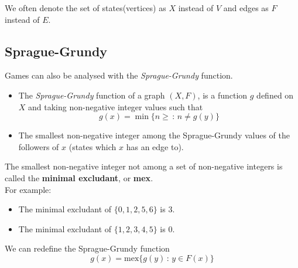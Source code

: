 \documentclass[12pt,t]{beamer}
\newcommand{\bi}{\begin{itemize}}
\newcommand{\ei}{\end{itemize}}
\begin{document}
\begin{frame}[fragile]
\begin{figure}
  \end{figure}
  We often denote the set of states(vertices) as $X$ instead of $V$ and edges as $F$ instead of $E$.
\end{frame}

\subsection{Sprague-Grundy}
\begin{frame}
  \vspace{30pt}
  Games can also be analysed with the \emph{Sprague-Grundy} function.
  \bi
    \item The \emph{Sprague-Grundy} function of a graph $(X,F)$, is a function $g$ defined on $X$ and taking non-negative integer values such that
      \[
        g(x) = \min\{n \geq\, :\, n \neq g(y) \}
      \]
    \item The smallest non-negative integer among the Sprague-Grundy values of
      the followers of $x$ (states which $x$ has an edge to).
  \ei
\end{frame}

\begin{frame}
  \vspace{30pt}
  The smallest non-negative integer not among a set of non-negative integers is
  called the \textbf{minimal excludant}, or \textbf{mex}.\\
  For example:
  \bi
    \item The minimal excludant of $\{0,1,2,5,6\}$ is $3$.
    \item The minimal excludant of $\{1,2,3,4,5\}$ is $0$.
  \ei
  We can redefine the Sprague-Grundy function
  \[
    g(x) = \text{mex}\{g(y) \, : \, y \in F(x)\}
  \]
\end{frame}
\end{document}
